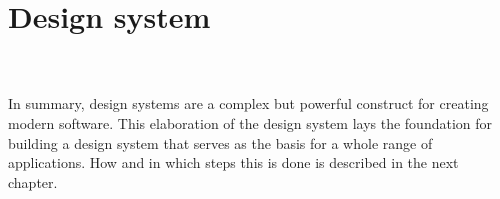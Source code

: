 \newpage
\section{Design system}\label{design_systems}

%
\\
\\
In summary, design systems are a complex but powerful construct for creating modern software. This elaboration of the design system lays the foundation for building a design system that serves as the basis for a whole range of applications. How and in which steps this is done is described in the next chapter.